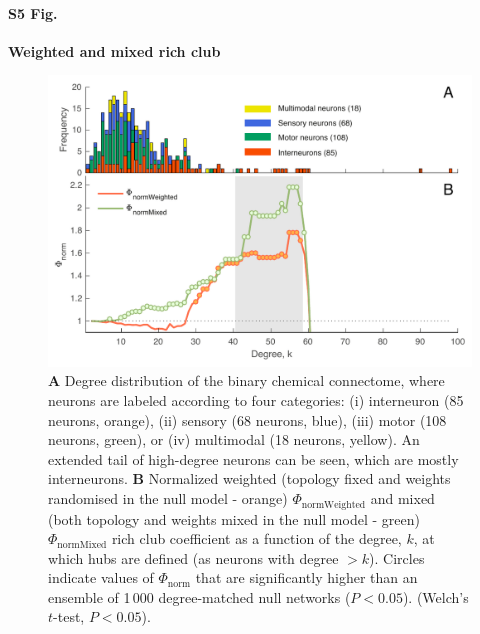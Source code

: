 \documentclass[10pt,letterpaper]{article}
\begin{document}
\paragraph*{S5 Fig.}
{\bf Weighted and mixed rich club}
\begin{figure}[!h]
\label{S5_Fig}
\centering
    \includegraphics[width=1\textwidth]{WeightedMixedRC.pdf}
    \caption{\textbf{A} Degree distribution of the binary chemical connectome, where neurons are labeled according to four categories:
(i) interneuron (85 neurons, orange),
(ii) sensory (68 neurons, blue),
(iii) motor (108 neurons, green), or
(iv) multimodal (18 neurons, yellow).
An extended tail of high-degree neurons can be seen, which are mostly interneurons.
\textbf{B}
Normalized weighted (topology fixed and weights randomised in the null model - orange) $\Phi_\mathrm{normWeighted}$ and mixed (both topology and weights mixed in the null model - green) $\Phi_\mathrm{normMixed}$ rich club coefficient as a function of the degree, $k$, at which hubs are defined (as neurons with degree $>k$).
Circles indicate values of $\Phi_\mathrm{norm}$ that are significantly higher than an ensemble of 1\,000 degree-matched null networks ($P < 0.05$).
(Welch's $t$-test, $P < 0.05$).}
\end{figure}

\end{document}
